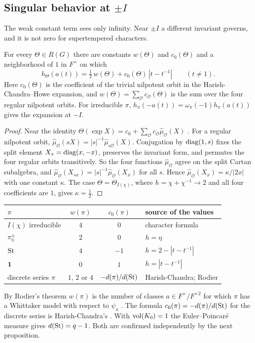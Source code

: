 \subsection{Singular behavior at $\pm I$}\label{sub:germ}
The weak constant term sees only infinity. Near $\pm I$ a different invariant governs, and it is not zero for supertempered characters.

\begin{theorem}\label{thm:germ}For every $\Theta\in R(G)$ there are constants $w(\Theta)$ and $c_0(\Theta)$ and a neighborhood of $1$ in $F^\times$ on which
\[
h_\Theta(a(t))=\tfrac12\,w(\Theta)+c_0(\Theta)\,|t-t^{-1}|\qquad(t\ne1).
\]
Here $c_0(\Theta)$ is the coefficient of the trivial nilpotent orbit in the Harish-Chandra--Howe expansion, and $w(\Theta)=\sum_{\mathcal O}c_{\mathcal O}(\Theta)$ is the sum over the four regular nilpotent orbits. For irreducible $\pi$, $h_\pi(-a(t))=\omega_\pi(-1)h_\pi(a(t))$ gives the expansion at $-I$.
\end{theorem}
\begin{proof}
Near the identity $\Theta(\exp X)=c_0+\sum_{\mathcal O}c_{\mathcal O}\widehat\mu_{\mathcal O}(X)$ \cite{HC99}. For a regular nilpotent orbit, $\widehat\mu_{\mathcal O}(sX)=|s|^{-1}\widehat\mu_{s\mathcal O}(X)$. Conjugation by $\operatorname{diag}(1,s)$ fixes the split element $X_x=\operatorname{diag}(x,-x)$, preserves the invariant form, and permutes the four regular orbits transitively. So the four functions $\widehat\mu_{\mathcal O}$ agree on the split Cartan subalgebra, and $\widehat\mu_{\mathcal O}(X_{sx})=|s|^{-1}\widehat\mu_{\mathcal O}(X_x)$ for all $s$. Hence $\widehat\mu_{\mathcal O}(X_x)=\kappa/|2x|$ with one constant $\kappa$. The case $\Theta=\Theta_{I(\chi)}$, where $h=\chi+\chi^{-1}\to2$ and all four coefficients are $1$, gives $\kappa=\tfrac12$.
\end{proof}

\begin{center}\small
\begin{tabular}{@{}lccl@{}}\toprule
$\pi$ & $w(\pi)$ & $c_0(\pi)$ & source of the values\\\midrule
$I(\chi)$ irreducible & $4$ & $0$ & character formula\\
$\pi_\eta^\pm$ & $2$ & $0$ & $h=\eta$\\
$\operatorname{St}$ & $4$ & $-1$ & $h=2-|t-t^{-1}|$\\
$\mathbf 1$ & $0$ & $1$ & $h=|t-t^{-1}|$\\
discrete series $\pi$ & $1$, $2$ or $4$ & $-d(\pi)/d(\operatorname{St})$ & Harish-Chandra; Rodier\\\bottomrule
\end{tabular}
\end{center}
By Rodier's theorem $w(\pi)$ is the number of classes $a\in F^\times/F^{\times2}$ for which $\pi$ has a Whittaker model with respect to $\psi_a$ \cite{Ro75}. The formula $c_0(\pi)=-d(\pi)/d(\operatorname{St})$ for the discrete series is Harish-Chandra's \cite{HC99}. With $\operatorname{vol}(K_0)=1$ the Euler--Poincar\'e measure gives $d(\operatorname{St})=q-1$. Both are confirmed independently by the next proposition.

